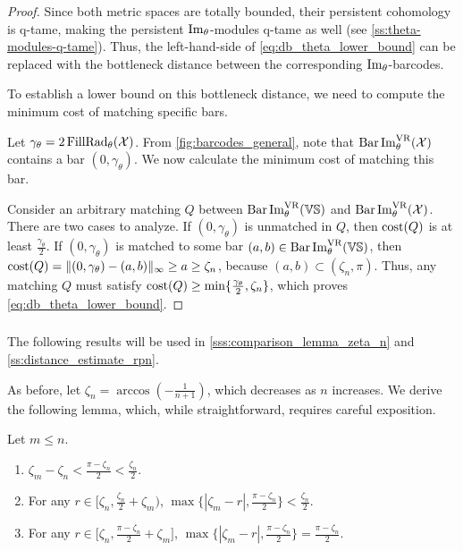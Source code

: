 \begin{proof}
    Since both metric spaces are totally bounded, their persistent cohomology is q-tame, making the persistent $\operatorname{Im}_\theta$-modules q-tame as well (see \cref{ss:theta-modules-q-tame}).
    Thus, the left-hand-side of \cref{eq:db_theta_lower_bound} can be replaced with the bottleneck distance between the corresponding $\operatorname{Im}_\theta$-barcodes.

    To establish a lower bound on this bottleneck distance, we need to compute the minimum cost of matching specific bars.

    Let \( \gamma_\theta = 2\operatorname{FillRad}_{\theta}(\mathcal{X}) \). 
    From \cref{fig:barcodes_general}, note that \( \operatorname{Bar}\operatorname{Im}_{\theta}^{\mathrm{VR}} (\mathcal{X}) \) contains a bar \( (0, \gamma_\theta) \). 
    We now calculate the minimum cost of matching this bar.

    Consider an arbitrary matching \( Q \) between \( \operatorname{Bar}\operatorname{Im}_{\theta}^{\mathrm{VR}} (\mathbb{V}\mathbb{S}) \) and \( \operatorname{Bar}\operatorname{Im}_{\theta}^{\mathrm{VR}} (\mathcal{X}) \). 
    There are two cases to analyze.
	If $(0,\gamma_\theta )$ is unmatched in $Q$, then $\mathrm{cost}(Q)$ is at least $ \tfrac{\gamma_\theta }{2}$.
	If $(0,\gamma_\theta )$ is matched to some bar $(a,b) \in \operatorname{Bar}\operatorname{Im}_{\theta}^{\mathrm{VR}} (\mathbb{V}\mathbb{S})$, then
	$\mathrm{cost}(Q) =  \|(0,\gamma_\theta ) - (a,b)\|_\infty \geq a \geq \zeta_n$, because $(a,b) \subset (\zeta_n, \pi)$.
	Thus, any matching $Q$ must satisfy $\mathrm{cost}(Q) \geq \min\{\tfrac{\gamma_\theta }{2}, \zeta_n\}$, which proves \cref{eq:db_theta_lower_bound}.
\end{proof}


\subsubsection{}
\label{sss:comparison_lemma}

The following results will be used in \cref{sss:comparison_lemma_zeta_n} and \cref{ss:distance_estimate_rpn}.

As before, let $\zeta_n = \arccos{(-\tfrac{1}{n+1})}$, which decreases as $n$ increases.
We derive the following lemma, which, while straightforward, requires careful exposition.

\medskip\lemma
Let $m \leq n$.
\begin{enumerate}
    \item \(\zeta_m - \zeta_n < \tfrac{\pi - \zeta_n}{2} < \tfrac{\zeta_n}{2}.\)

    \item For any $r \in \big[\zeta_n, \tfrac{\zeta_n}{2}+\zeta_m\big)$, $\max\big\{|\zeta_m  - r |, \tfrac{\pi - \zeta_n}{2}\big\} < \tfrac{\zeta_n}{2}$.

    \item For any $r \in \big[\zeta_n, \tfrac{\pi - \zeta_n}{2} + \zeta_m\big]$, $\max\{|\zeta_m  - r |, \tfrac{\pi - \zeta_n}{2}\} = \tfrac{\pi - \zeta_n}{2}$.
\end{enumerate}


